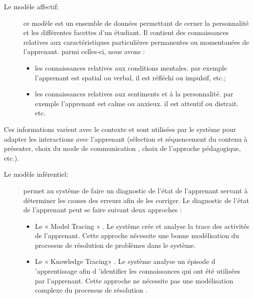 \begin{description}
    \item[Le modèle affectif:]  ce modèle est un ensemble de données permettant de cerner la personnalité et les différentes facettes d'un étudiant. Il contient des connaissances relatives aux caractéristiques particulières permanentes ou momentanées de l'apprenant. parmi celles-ci, nous avons :
    \begin{itemize}
        \item  les connaissances relatives aux conditions mentales. par exemple l'apprenant est	spatial ou verbal, il est réfléchi ou impulsif, etc.;
        \item les connaissances relatives aux sentiments et à la personnalité. par exemple l'apprenant est calme ou anxieux. il est attentif ou distrait. etc.
    \end{itemize}
\end{description}
    Ces informations varient avec le contexte et sont utilisées par le système pour adapter les interactions avec l'apprenant (sélection et séquencement du contenu à présenter, choix du mode de communication , choix de l'approche pédagogique, etc.).
\begin{description}
    \item[Le modèle inférentiel:] permet au système de faire un diagnostic de l'état de l'apprenant servant à déterminer les causes des erreurs afin de les corriger. Le diagnostic de l'état de l'apprenant peut se faire suivant deux approches : 
    \begin{itemize}
        \item Le « Model Tracing » . Le système crée et analyse la trace des activités de l'apprenant. Cette approche nécessite une bonne modélisation du processus de résolution de problèmes dans le système. 
        \item Le « Knowledge Tracing» . Le système analyse un épisode d 'apprentissage afin d 'identifier les connaissances qui ont été utilisées par l'apprenant. Cette approche ne nécessite pas une modélisation complexe du processus de résolution . 
    \end{itemize}
\end{description}
